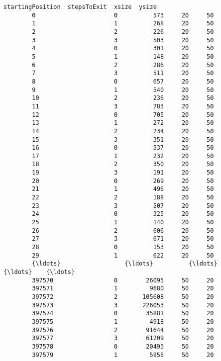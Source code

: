 \documentclass[11pt]{article}
\begin{document}
\begin{Verbatim}[commandchars=\\\{\}]
                startingPosition  stepsToExit  xsize  ysize  
        0                      0          573     20     50  
        1                      1          268     20     50  
        2                      2          226     20     50  
        3                      3          503     20     50  
        4                      0          301     20     50  
        5                      1          148     20     50  
        6                      2          286     20     50  
        7                      3          511     20     50  
        8                      0          657     20     50  
        9                      1          540     20     50  
        10                     2          236     20     50  
        11                     3          783     20     50  
        12                     0          705     20     50  
        13                     1          272     20     50  
        14                     2          234     20     50  
        15                     3          351     20     50  
        16                     0          537     20     50  
        17                     1          232     20     50  
        18                     2          350     20     50  
        19                     3          191     20     50  
        20                     0          269     20     50  
        21                     1          496     20     50  
        22                     2          188     20     50  
        23                     3          507     20     50  
        24                     0          325     20     50  
        25                     1          140     20     50  
        26                     2          606     20     50  
        27                     3          671     20     50  
        28                     0          153     20     50  
        29                     1          622     20     50  
        {\ldots}                  {\ldots}          {\ldots}    {\ldots}    {\ldots}  
        397570                 0        26095     50     20  
        397571                 1         9680     50     20  
        397572                 2       105608     50     20  
        397573                 3       226053     50     20  
        397574                 0        35881     50     20  
        397575                 1         4918     50     20  
        397576                 2        91644     50     20  
        397577                 3        61209     50     20  
        397578                 0        20493     50     20  
        397579                 1         5958     50     20  

\end{Verbatim}
\end{document}
